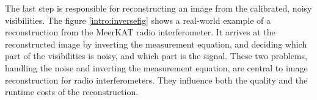 The last step is responsible for reconstructing an image from the calibrated, noisy visibilities. The figure \ref{intro:inversefig} shows a real-world example of a reconstruction from the MeerKAT radio interferometer. It arrives at the reconstructed image by inverting the measurement equation, and deciding which part of the visibilities is noisy, and which part is the signal. These two problems, handling the noise and inverting the measurement equation, are central to image reconstruction for radio interferometers. They influence both the quality and the runtime costs of the reconstruction.

\begin{figure}[htp]
	\sbox{}
	\setlength{\twosubht}{\ht\twosubbox}
	

\end{figure}
